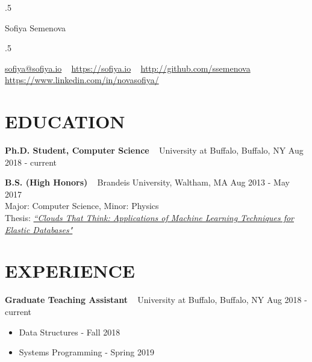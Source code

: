 \documentclass{res}
\begin{document}
 \moveleft.5\hoffset\centerline{\namefont Sofiya Semenova}
 \smallskip
 \moveleft.5\hoffset\centerline{\href{mailto:sofiya@sofiya.io}{sofiya@sofiya.io} ~ \href{https://sofiya.io}{https://sofiya.io} ~ \href{http://github.com/ssemenova}{http://github.com/ssemenova} ~ \href{https://www.linkedin.com/in/novasofiya/}{https://www.linkedin.com/in/novasofiya/}}


\vspace{-4mm}

\begin{resume}


\section{EDUCATION}

\textbf{Ph.D. Student, Computer Science} ~ University at Buffalo, Buffalo, NY \hfill Aug 2018 - current

\textbf{B.S. (High Honors)} ~ Brandeis University, Waltham, MA \hfill Aug 2013 - May 2017 \\
	Major: Computer Science, Minor: Physics \\
	Thesis: \href{https://sofiya.io/media/thesis.pdf}{\sl “Clouds That Think: Applications of Machine Learning Techniques for Elastic Databases"}

\section{EXPERIENCE}

\textbf{Graduate Teaching Assistant} ~ University at Buffalo, Buffalo, NY \hfill Aug 2018 - current \\ 
	\begin{itemize}  \itemsep -2pt %
	\item Data Structures - Fall 2018
	\item Systems Programming - Spring 2019
	\end{itemize}


\end{resume}
\end{document}

